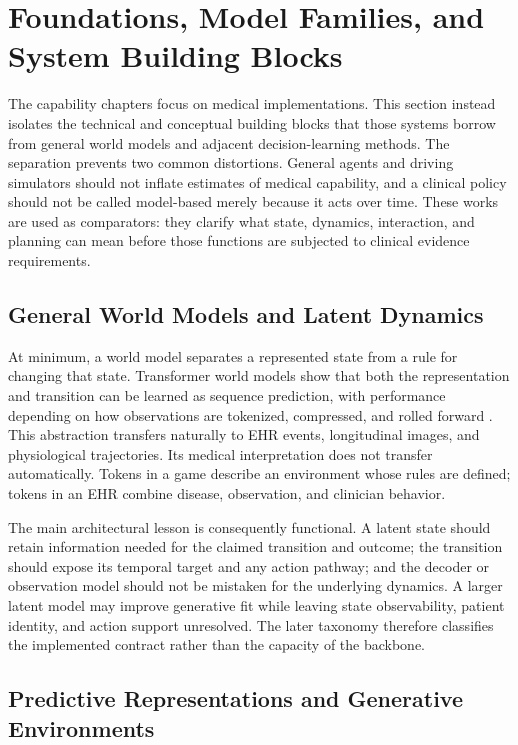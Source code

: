 \section{Foundations, Model Families, and System Building Blocks}
\label{sec:foundations}

The capability chapters focus on medical implementations. This section instead isolates the technical and conceptual building blocks that those systems borrow from general world models and adjacent decision-learning methods. The separation prevents two common distortions. General agents and driving simulators should not inflate estimates of medical capability, and a clinical policy should not be called model-based merely because it acts over time. These works are used as comparators: they clarify what state, dynamics, interaction, and planning can mean before those functions are subjected to clinical evidence requirements.

\subsection{General World Models and Latent Dynamics}

At minimum, a world model separates a represented state from a rule for changing that state. Transformer world models show that both the representation and transition can be learned as sequence prediction, with performance depending on how observations are tokenized, compressed, and rolled forward \citep{Micheli2023TransformersAreSample,Robine2023TransformerBasedWorld}. This abstraction transfers naturally to EHR events, longitudinal images, and physiological trajectories. Its medical interpretation does not transfer automatically. Tokens in a game describe an environment whose rules are defined; tokens in an EHR combine disease, observation, and clinician behavior.

The main architectural lesson is consequently functional. A latent state should retain information needed for the claimed transition and outcome; the transition should expose its temporal target and any action pathway; and the decoder or observation model should not be mistaken for the underlying dynamics. A larger latent model may improve generative fit while leaving state observability, patient identity, and action support unresolved. The later taxonomy therefore classifies the implemented contract rather than the capacity of the backbone.

\subsection{Predictive Representations and Generative Environments}

